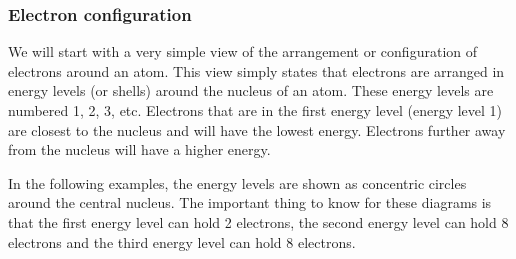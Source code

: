             \subsubsection{ Electron configuration}
            \nopagebreak
            \label{m38741*id9722401}We will start with a very simple view of the arrangement or configuration of electrons around an atom. This view simply states that electrons are arranged in energy levels (or shells) around the nucleus of an atom. These energy levels are numbered 1, 2, 3, etc. Electrons that are in the first energy level (energy level 1) are closest to the nucleus and will have the lowest energy. Electrons further away from the nucleus will have a higher energy. \par 
\label{m38741*id259357}In the following examples, the energy levels are shown as concentric circles around the central nucleus. The important thing to know for these diagrams is that the first energy level can hold 2 electrons, the second energy level can hold 8 electrons and the third energy level can hold 8 electrons.\par 
